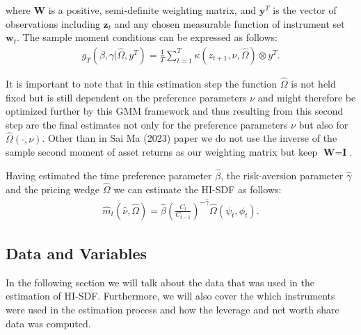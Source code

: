 \documentclass[12pt,a4paper]{article}
\begin{document}
		where \textbf{W} is a positive, semi-definite weighting matrix, and $\textbf{y}^T$ is the vector of observations including $\textbf{z}_t$ and any chosen measurable function of instrument set $\textbf{w}_t$. The sample moment conditions can be expressed as follows: 
		\begin{align}
			g_T\left(\beta, \gamma \vert \hat{\Omega}, y^T\right) = \frac{1}{T} \sum_{t=1}^T \kappa\left(z_{t+1}, \nu, \hat{\Omega}\right) \otimes y^T.
			\label{eq:mom_cond_gmm}
		\end{align}
		
		It is important to note that in this estimation step the function $\hat{\Omega}$ is not held fixed but is still dependent on the preference parameters $\nu$ and might therefore be optimized further by this GMM framework and thus resulting from this second step are the final estimates not only for the preference parameters $\nu$ but also for $\hat{\Omega}(\cdot, \nu)$.
		Other than in Sai Ma (2023) paper we do not use the inverse of the sample second moment of asset returns as our weighting matrix but keep $ \textbf{W} = \textbf{I}$.
		
		Having estimated the time preference parameter $\hat{\beta}$, the risk-aversion parameter $\hat{\gamma}$ and the pricing wedge $\hat{\Omega}$ we can estimate the HI-SDF as follows:
		\begin{align}
			\hat{m}_t (\hat{\nu}, \hat{\Omega}) = \hat{\beta} \left( \frac{C_t}{C_{t-1}} \right)^{-\hat{\gamma}} \hat{\Omega}(\psi_{t}, \phi_{t}).
			\label{eq:HI_SDF_M_Final_Estimation} 
		\end{align}
		
	
	

	
	\subsection{Data and Variables}
%	
%	
	
	In the following section we will talk about the data that was used in the estimation of HI-SDF. Furthermore, we will also cover the which instruments were used in the estimation process and how the leverage and net worth share data was computed.
	
\end{document}
